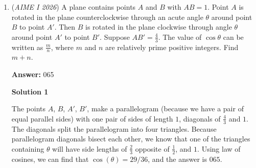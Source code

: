 \begin{enumerate}
 More can be removed, such as primes, that cannot be factorized into a number less than or equal to $101$.By beast academy memorization, there are 25 primes less than or equal to 101. $95 - 25 = \fbox{070}$, which is the answer.

 



\textbf{Solution 5 (SFFT + Solution 1, Proving no other cases exist)}

Consider $k \in \{1, 2, \dots, 100 \}$. Then, $a + b + ab = k$ so $(a+1)(b+1) = k+1$. That implies $k+1 \in \{2, 3, \dots, 101 \}$. All primes in this list fail as one of $a, b = 0$ which is not considered a positive integer, in which a quick counting check gives 74. However, perfect squares of PRIMES also fail as both $a$ and $b$ would be forced to the same prime number $p$ in which we have 4 cases, so 74. We now show all other cases work.

 If primes don't work, check cubes, in which we can factor to $p$ and $p^2$ anyways. Check fourth powers, which can be a cube times another power. For any $p^n$ for $n \ge 3$, we can factor into $p^{n-1}$ and $p$, which works. Therefore, all other values work.

 For any integer that has a prime factorization with more than 2 primes, say $x$ and $y$ to some $n$, each going to be less than 101, simply give those values to $a$ and $b$ to obtain a valid ordering.

 The answer is $74-4 = \boxed{70}$.

 


	\item (\textit{AIME I 2026}) A plane contains points $A$ and $B$ with $AB=1$. Point $A$ is rotated in the plane counterclockwise through an acute angle $\theta$ around point $B$ to point $A'$. Then $B$ is rotated in the plane clockwise through angle $\theta$ around point $A'$ to point $B'$. Suppose $AB'=\frac{4}{3}$. The value of $\cos\theta$ can be written as $\frac{m}{n}$, where $m$ and $n$ are relatively prime positive integers. Find $m+n$.


 
 \textbf{Answer: }065



\textbf{Solution 1}

The points $A$, $B$, $A\prime$, $B\prime$, make a parallelogram (because we have a pair of equal parallel sides) with one pair of sides of length $1$, diagonals of $\frac{4}{3}$ and $1$. The diagonals split the parallelogram into four triangles. Because parallelogram diagonals bisect each other, we know that one of the triangles containing $\theta$ will have side lengths of $\frac{2}{3}$ opposite of $\frac{1}{2}$, and $1$. Using law of cosines, we can find that $\cos(\theta)=29/36$, and the answer is $\boxed{065}$.


\end{enumerate}
